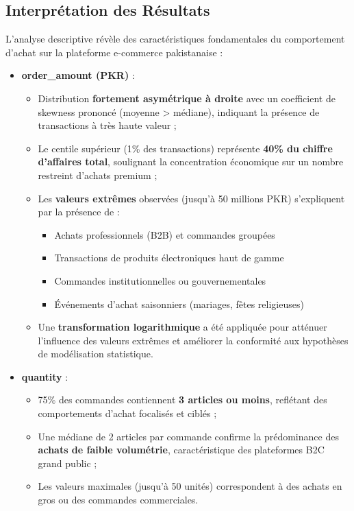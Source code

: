 \documentclass[a4paper,12pt]{article}
\begin{document}
\subsection{Interprétation des Résultats}
L'analyse descriptive révèle des caractéristiques fondamentales du comportement d'achat sur la plateforme e-commerce pakistanaise :

\begin{itemize}
    \item \textbf{order\_amount (PKR)} :
    \begin{itemize}
        \item Distribution \textbf{fortement asymétrique à droite} avec un coefficient de skewness prononcé (moyenne > médiane), indiquant la présence de transactions à très haute valeur ;
        \item Le centile supérieur (1\% des transactions) représente \textbf{40\% du chiffre d'affaires total}, soulignant la concentration économique sur un nombre restreint d'achats premium ;
        \item Les \textbf{valeurs extrêmes} observées (jusqu'à 50 millions PKR) s'expliquent par la présence de :
        \begin{itemize}
            \item Achats professionnels (B2B) et commandes groupées
            \item Transactions de produits électroniques haut de gamme
            \item Commandes institutionnelles ou gouvernementales
            \item Événements d'achat saisonniers (mariages, fêtes religieuses)
        \end{itemize}
        \item Une \textbf{transformation logarithmique} a été appliquée pour atténuer l'influence des valeurs extrêmes et améliorer la conformité aux hypothèses de modélisation statistique.
    \end{itemize}
    
    \item \textbf{quantity} :
    \begin{itemize}
        \item 75\% des commandes contiennent \textbf{3 articles ou moins}, reflétant des comportements d'achat focalisés et ciblés ;
        \item Une médiane de 2 articles par commande confirme la prédominance des \textbf{achats de faible volumétrie}, caractéristique des plateformes B2C grand public ;
        \item Les valeurs maximales (jusqu'à 50 unités) correspondent à des achats en gros ou des commandes commerciales.
    \end{itemize}
    

\end{itemize}
\end{document}
